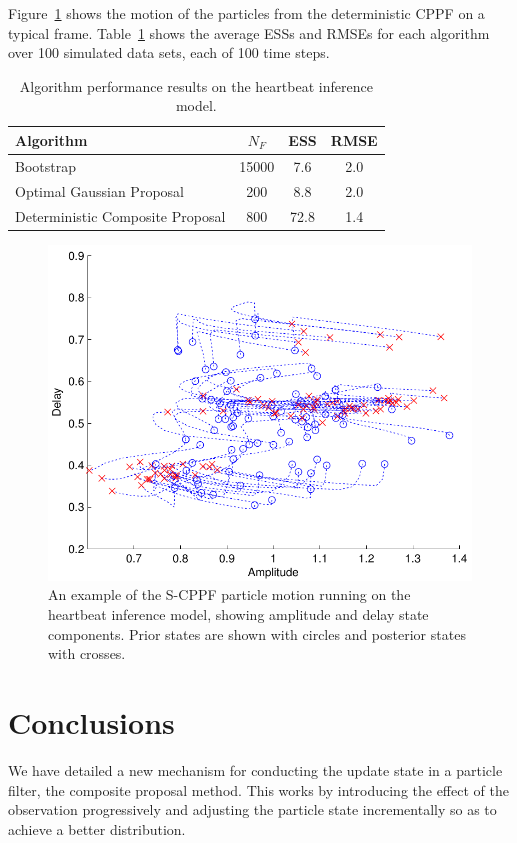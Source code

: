 \documentclass{article}
\begin{document}
Figure~\ref{fig:sineha_example_frame} shows the motion of the particles from the deterministic CPPF on a typical frame. Table~\ref{tab:sineha_results} shows the average ESSs and RMSEs for each algorithm over 100 simulated data sets, each of 100 time steps.%
%
\begin{table}
\centering
\begin{tabular}{l||c|c|c}
Algorithm                                & $N_F$ & ESS  & RMSE \\
\hline
Bootstrap                                & 15000 &  7.6 &  2.0 \\
Optimal Gaussian Proposal                &   200 &  8.8 &  2.0 \\
Deterministic Composite Proposal         &   800 & 72.8 &  1.4 \\
\end{tabular}
\caption{Algorithm performance results on the heartbeat inference model.}
\label{tab:sineha_results}
\end{table}
%
\begin{figure}
\centering
\includegraphics[width=0.45\columnwidth]{sineha_example_frame.pdf}
\caption{An example of the S-CPPF particle motion running on the heartbeat inference model, showing amplitude and delay state components. Prior states are shown with circles and posterior states with crosses.}
\label{fig:sineha_example_frame}
\end{figure}



\section{Conclusions}

We have detailed a new mechanism for conducting the update state in a particle filter, the composite proposal method. This works by introducing the effect of the observation progressively and adjusting the particle state incrementally so as to achieve a better distribution.
\end{document}
